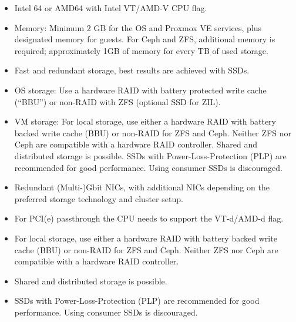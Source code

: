 \begin{itemize}[leftmargin=2cm]

	\item Intel 64 or AMD64 with Intel VT/AMD-V CPU flag.

	\item Memory: Minimum 2 GB for the OS and Proxmox VE services, plus designated memory for guests. For Ceph and ZFS, additional memory is required; approximately 1GB of memory for every TB of used storage.

	\item Fast and redundant storage, best results are achieved with SSDs.

	\item OS storage: Use a hardware RAID with battery protected write cache (“BBU”) or non-RAID with ZFS (optional SSD for ZIL).

	\item VM storage: For local storage, use either a hardware RAID with battery backed write cache (BBU) or non-RAID for ZFS and Ceph. Neither ZFS nor Ceph are compatible with a hardware RAID controller. Shared and distributed storage is possible. SSDs with Power-Loss-Protection (PLP) are recommended for good performance. Using consumer SSDs is discouraged.

	\item Redundant (Multi-)Gbit NICs, with additional NICs depending on the preferred storage technology and cluster setup.

	\item For PCI(e) passthrough the CPU needs to support the VT-d/AMD-d flag.

\end{itemize}

\begin{itemize}[leftmargin=2cm]

	\item For local storage, use either a hardware RAID with battery backed write cache (BBU) or non-RAID for ZFS and Ceph. Neither ZFS nor Ceph are compatible with a hardware RAID controller.

	\item Shared and distributed storage is possible.

	\item SSDs with Power-Loss-Protection (PLP) are recommended for good performance. Using consumer SSDs is discouraged.

\end{itemize}


